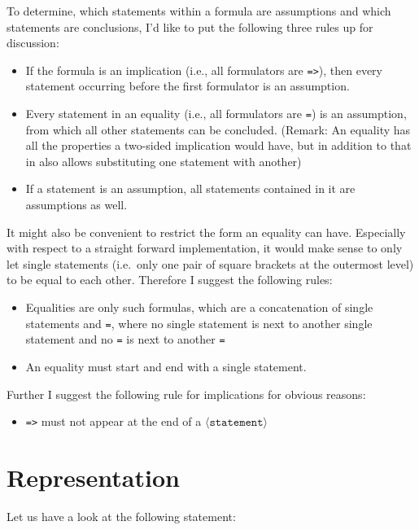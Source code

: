 \documentclass[british]{article}
\newcommand\prv{bc}
\newcommand\m[1]{\texttt{#1}}
\newenvironment{code}{\captionsetup{type=listing}}{}
\begin{document}
To determine, which statements within a formula are assumptions and
which statements are conclusions, I'd like to put the following three
rules up for discussion:
\begin{itemize}
\item If the formula is an implication (i.e., all formulators are \m{=>}),
then every statement occurring before the first formulator is an assumption.
\item Every statement in an equality (i.e., all formulators are \m{=})
is an assumption, from which all other statements can be concluded.
(Remark: An equality has all the properties a two-sided implication
would have, but in addition to that in also allows substituting one
statement with another)
\item If a statement is an assumption, all statements contained in it are
assumptions as well.
\end{itemize}
\medskip{}

It might also be convenient to restrict the form an equality can have.
Especially with respect to a straight forward implementation, it would
make sense to only let single statements (i.e.\ only one pair of square
brackets at the outermost level) to be equal to each other. Therefore
I suggest the following rules:
\begin{itemize}
\item Equalities are only such formulas, which are a concatenation of single
statements and \m{=}, where no single statement is next to another
single statement and no \m{=} is next to another \m{=}
\item An equality must start and end with a single statement.
\end{itemize}
\medskip{}
Further I suggest the following rule for implications for obvious
reasons:
\begin{itemize}
\item \m{=>} must not appear at the end of a $\langle\texttt{statement}\rangle$
\end{itemize}
\pagebreak{}

\section{Representation}

Let us have a look at the following statement:

\begin{code}
\label{code:ex1}
\inputminted[linenos]{\prv}{examples/exmp1.prove}
\end{code}
\end{document}
